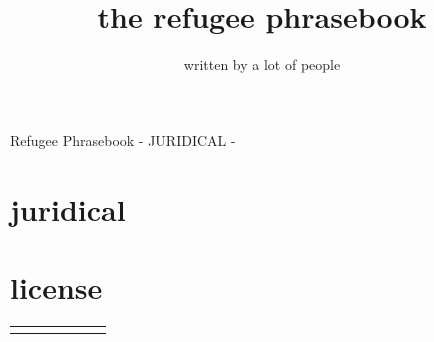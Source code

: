 \documentclass[ %
	11pt, %
	paper=a4,
	landscape,
	abstract=on,
	version=last]{scrartcl}
\author{written by a lot of people}
\title{the refugee phrasebook}
\begin{document}
{\Large Refugee Phrasebook - JURIDICAL - }
\section*{juridical}



\section*{license}
 \newline


\begin{longtabu}{X[l] X[l] X[l] X[l] X[l] X[l]}
\everyrow {\tabucline[ on 1 pt ] - }
\toprule

\midrule
\endhead

\end{longtabu}
\end{document}
